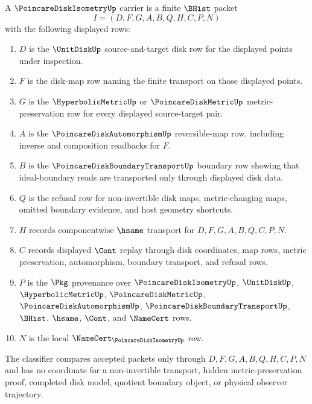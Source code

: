 \begin{definition}
\label{def:poincare-disk-isometry-carrier}
A $\PoincareDiskIsometryUp$ carrier is a finite $\BHist$ packet
$$
I=(D,F,G,A,B,Q,H,C,P,N)
$$
with the following displayed rows:
\begin{enumerate}
\item $D$ is the $\UnitDiskUp$ source-and-target disk row for the displayed points under inspection.
\item $F$ is the disk-map row naming the finite transport on those displayed points.
\item $G$ is the $\HyperbolicMetricUp$ or $\PoincareDiskMetricUp$ metric-preservation row for every displayed source-target pair.
\item $A$ is the $\PoincareDiskAutomorphismUp$ reversible-map row, including inverse and composition readbacks for $F$.
\item $B$ is the $\PoincareDiskBoundaryTransportUp$ boundary row showing that ideal-boundary reads are transported only through displayed disk data.
\item $Q$ is the refusal row for non-invertible disk maps, metric-changing maps, omitted boundary evidence, and host geometry shortcuts.
\item $H$ records componentwise $\hsame$ transport for $D,F,G,A,B,Q,C,P,N$.
\item $C$ records displayed $\Cont$ replay through disk coordinates, map rows, metric preservation, automorphism, boundary transport, and refusal rows.
\item $P$ is the $\Pkg$ provenance over $\PoincareDiskIsometryUp$, $\UnitDiskUp$, $\HyperbolicMetricUp$, $\PoincareDiskMetricUp$, $\PoincareDiskAutomorphismUp$, $\PoincareDiskBoundaryTransportUp$, $\BHist$, $\hsame$, $\Cont$, and $\NameCert$ rows.
\item $N$ is the local $\NameCert_{\PoincareDiskIsometryUp}$ row.
\end{enumerate}
The classifier compares accepted packets only through $D,F,G,A,B,Q,H,C,P,N$ and has no coordinate for a non-invertible transport, hidden metric-preservation proof, completed disk model, quotient boundary object, or physical observer trajectory.
\end{definition}

